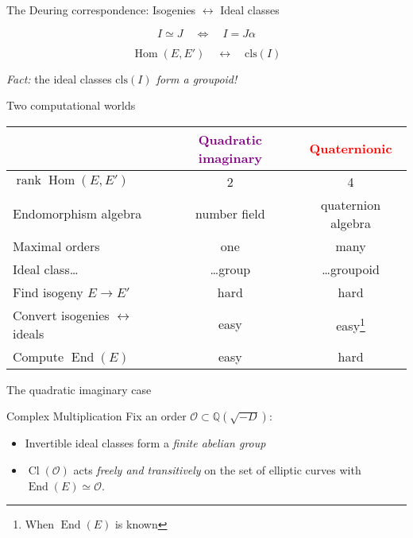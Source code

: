 \documentclass[aspectratio=169]{beamer}
\renewcommand{\O}{\mathcal{O}}
\newcommand{\End}{\operatorname{End}}
\newcommand{\Hom}{\operatorname{Hom}}
\newcommand{\Cl}{\operatorname{Cl}}
\DeclareMathOperator{\rank}{rank}
\begin{document}

\begin{frame}{The Deuring correspondence: Isogenies $\longleftrightarrow$ Ideal classes}
  \Large
  \begin{description}
    \setlength{\itemsep}{2em}
  \item[Equivalent ideals:]
    \[I ≃ J  \quad\Longleftrightarrow\quad I = Jα\]
  \item[Deuring correspondence:]
    \[\Hom(E,E') \quad\longleftrightarrow\quad \mathrm{cls}(I)\]
  \end{description}
  
  \bigskip \emph{Fact:} the ideal classes \emph{$\mathrm{cls}(I)$ form a groupoid!}
\end{frame}


\begin{frame}{Two computational worlds}
  \centering
  \setlength{\tabcolsep}{2em}
  \renewcommand{\arraystretch}{1.5}
  \begin{tabular}{p{} c c}
    & \textcolor{purple}{Quadratic imaginary} & \textcolor{red}{Quaternionic}\\
    \hline
    $\rank\Hom(E,E')$ & 2 & 4\\
    Endomorphism algebra & number field & quaternion algebra\\
    Maximal orders & one & many \\
    Ideal class\dots & \dots group & \dots groupoid\\
    Find isogeny $E → E'$ & \alert{hard} & \alert{hard}\\
    Convert isogenies $\leftrightarrow$ ideals & easy\footnotemark[1] & easy\footnote[1]{When $\End(E)$ is known}\\
    Compute $\End(E)$ & easy & \alert{hard}\\
  \end{tabular}
\end{frame}


\begin{frame}{The quadratic imaginary case}
  \begin{block}{Complex Multiplication}
    Fix an order \emph{$\O ⊂ ℚ(\sqrt{-D})$}:
    \begin{itemize}
    \item Invertible ideal classes form a \emph{finite abelian group}
    \item $\Cl(\O)$ acts \emph{freely and transitively} on the set of
      elliptic curves with $\End(E) ≃ \O$.
    \end{itemize}
  \end{block}
\end{frame}
\end{document}
